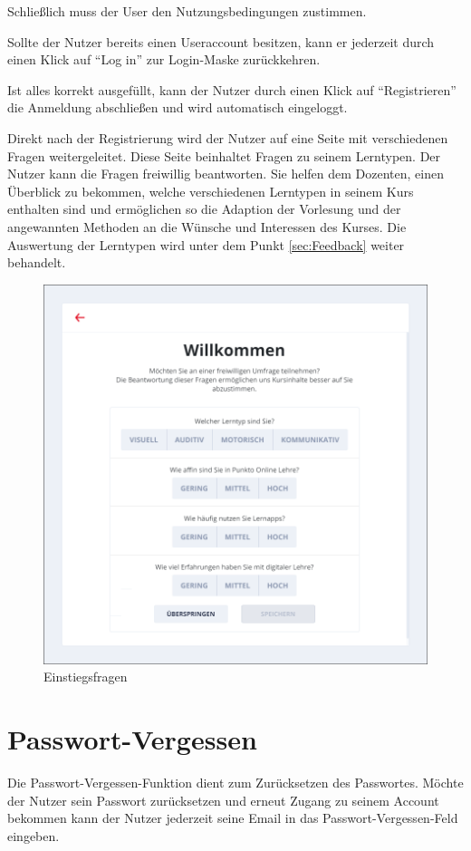 Schließlich muss der User den Nutzungsbedingungen zustimmen.

Sollte der Nutzer bereits einen Useraccount besitzen, kann er jederzeit durch einen Klick auf \enquote{Log in} zur Login-Maske zurückkehren.

Ist alles korrekt ausgefüllt, kann der Nutzer durch einen Klick auf \enquote{Registrieren} die Anmeldung abschließen und wird automatisch eingeloggt.

Direkt nach der Registrierung wird der Nutzer auf eine Seite mit verschiedenen Fragen weitergeleitet. Diese Seite beinhaltet Fragen zu seinem Lerntypen. 
Der Nutzer kann die Fragen freiwillig beantworten. Sie helfen dem Dozenten, einen Überblick zu bekommen, welche verschiedenen Lerntypen in seinem Kurs enthalten sind und ermöglichen so die Adaption der Vorlesung und der angewannten Methoden an die Wünsche und Interessen des Kurses. Die Auswertung der Lerntypen wird unter dem Punkt \autoref{sec:Feedback} weiter behandelt.

\begin{figure}[h]
    \centering
    \includegraphics[width=.7\textwidth]{img/Einstiegsfragen.png}
    \caption{Einstiegsfragen}
    \label{fig:einstiegsfragen}
\end{figure}


\section{Passwort-Vergessen}\label{sec:passwordVergessen}
Die Passwort-Vergessen-Funktion dient zum Zurücksetzen des Passwortes.
Möchte der Nutzer sein Passwort zurücksetzen und erneut Zugang zu seinem Account bekommen kann der Nutzer jederzeit seine Email in das Passwort-Vergessen-Feld eingeben.


